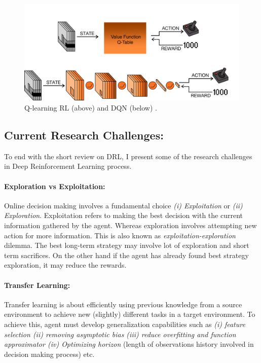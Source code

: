 \begin{figure}[t]
	\includegraphics[width=0.95\linewidth ]{fig/dqn.png}
    \vspace{-2mm}
    \caption{Q-learning RL (above) and DQN (below) \cite{mnih2015human}.}
    \label{fig:dqn}
\end{figure}

\subsection{Current Research Challenges:}
To end with the short review on DRL, I present some of the research challenges in Deep Reinforcement Learning process.
\paragraph{Exploration vs Exploitation:}
Online decision making involves a fundamental choice {\em (i) Exploitation} or {\em (ii) Exploration}. Exploitation refers to making the best decision with the current information gathered by the agent. Whereas exploration involves attempting new action for more information. This is also known as {\em exploitation-exploration} dilemma. The best long-term strategy may involve lot of exploration and short term sacrifices. On the other hand if the agent has already found best strategy exploration, it may reduce the rewards.

\paragraph{Transfer Learning:}
Transfer learning is about efficiently using previous knowledge from a
source environment to achieve new (slightly) different tasks in a target environment. To achieve this, agent must develop generalization capabilities such as {\em (i) feature selection (ii) removing asymptotic bias (iii) reduce overfitting and function approximator (iv) Optimizing horizon} (length of observations history involved in decision making process) etc.

